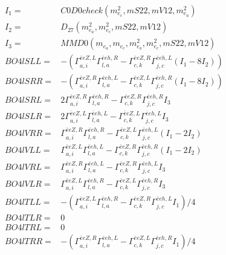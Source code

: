 \documentclass[A4,landscape]{article}
\begin{document}
\begin{align} 
I_1 = & C0D0check(m^2_{e_{{c}}}, mS22, mV12, m^2_{e_{{a}}}) \\ 
I_2 = & D_{27}(m^2_{e_{{a}}}, m^2_{e_{{c}}}, mS22, mV12) \\ 
I_3 = & MMD0(m_{e_{{a}}}, m_{e_{{c}}}, m^2_{e_{{a}}}, m^2_{e_{{c}}}, mS22, mV12) \\ 
  BO4lSLL= & -( \Gamma^{\bar{e}e Z ,L}_{a, i} \Gamma^{\bar{e}e h ,R}_{l, a} - \Gamma^{\bar{e}e Z ,R} _{c, k} \Gamma^{\bar{e}e h ,L}_{j, c} (I_1 - 8 I_2)) \\ 
  BO4lSRR= & -( \Gamma^{\bar{e}e Z ,R}_{a, i} \Gamma^{\bar{e}e h ,L}_{l, a} - \Gamma^{\bar{e}e Z ,L} _{c, k} \Gamma^{\bar{e}e h ,R}_{j, c} (I_1 - 8 I_2)) \\ 
  BO4lSRL= & 2  \Gamma^{\bar{e}e Z ,R}_{a, i} \Gamma^{\bar{e}e h ,R}_{l, a} - \Gamma^{\bar{e}e Z ,R} _{c, k} \Gamma^{\bar{e}e h ,R}_{j, c} I_3 \\ 
  BO4lSLR= & 2  \Gamma^{\bar{e}e Z ,L}_{a, i} \Gamma^{\bar{e}e h ,L}_{l, a} - \Gamma^{\bar{e}e Z ,L} _{c, k} \Gamma^{\bar{e}e h ,L}_{j, c} I_3 \\ 
  BO4lVRR= &  \Gamma^{\bar{e}e Z ,R}_{a, i} \Gamma^{\bar{e}e h ,R}_{l, a} - \Gamma^{\bar{e}e Z ,L} _{c, k} \Gamma^{\bar{e}e h ,L}_{j, c} (I_1 - 2 I_2) \\ 
  BO4lVLL= &  \Gamma^{\bar{e}e Z ,L}_{a, i} \Gamma^{\bar{e}e h ,L}_{l, a} - \Gamma^{\bar{e}e Z ,R} _{c, k} \Gamma^{\bar{e}e h ,R}_{j, c} (I_1 - 2 I_2) \\ 
  BO4lVRL= &  \Gamma^{\bar{e}e Z ,R}_{a, i} \Gamma^{\bar{e}e h ,L}_{l, a} - \Gamma^{\bar{e}e Z ,R} _{c, k} \Gamma^{\bar{e}e h ,L}_{j, c} I_3 \\ 
  BO4lVLR= &  \Gamma^{\bar{e}e Z ,L}_{a, i} \Gamma^{\bar{e}e h ,R}_{l, a} - \Gamma^{\bar{e}e Z ,L} _{c, k} \Gamma^{\bar{e}e h ,R}_{j, c} I_3 \\ 
  BO4lTLL= & -( \Gamma^{\bar{e}e Z ,L}_{a, i} \Gamma^{\bar{e}e h ,R}_{l, a} - \Gamma^{\bar{e}e Z ,R} _{c, k} \Gamma^{\bar{e}e h ,L}_{j, c} I_1)/4 \\ 
  BO4lTLR= & 0 \\ 
  BO4lTRL= & 0 \\ 
  BO4lTRR= & -( \Gamma^{\bar{e}e Z ,R}_{a, i} \Gamma^{\bar{e}e h ,L}_{l, a} - \Gamma^{\bar{e}e Z ,L} _{c, k} \Gamma^{\bar{e}e h ,R}_{j, c} I_1)/4 \\ 
\end{align} 
\end{document}
